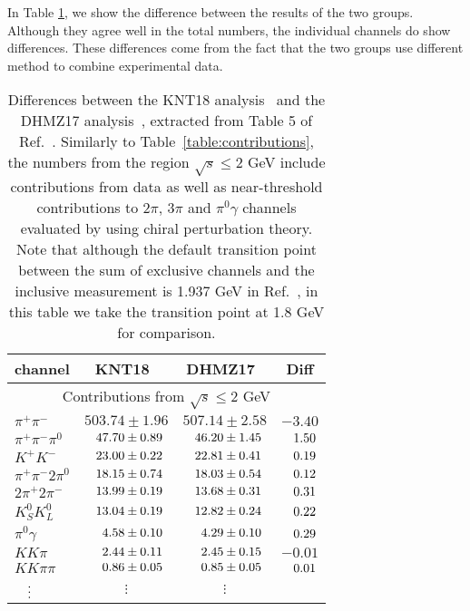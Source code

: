 In Table \ref{table:comparison}, we show the difference
between the results of the two groups.  Although they 
agree well in the total numbers, the individual channels
do show differences.  These differences come from the
fact that the two groups use different method to combine
experimental data.


\begin{table*} 
\caption{Differences between the KNT18 analysis~\cite{KNT18} 
and the DHMZ17 analysis~\cite{DHMZ17}, extracted from 
Table 5 of Ref.~\cite{KNT18}. 
Similarly to Table~\ref{table:contributions}, the numbers
from the region $\sqrt{s} \leq 2$ GeV
include contributions from data as well as near-threshold
contributions to $2\pi$, $3\pi$ and $\pi^0\gamma$ channels
evaluated by using chiral perturbation theory.
Note that although the default transition point
between the sum of exclusive channels and the inclusive
measurement is 1.937 GeV in Ref.~\cite{KNT18}, in this 
table we take the transition point at 1.8 GeV for comparison.}
%
\label{table:comparison}
%
\begin{center} \begin{tabular}{|l|c|c|c|}
\hline
channel        & KNT18~\cite{KNT18}    & DHMZ17~\cite{HLMNT} & Diff \\
\hline
\multicolumn{4}{|c|}{Contributions from $\sqrt{s} \leq 2$ GeV} \\
\hline
$\pi^+\pi^-$   &    $503.74 \pm 1.96$  &    $507.14 \pm 2.58$    & $-3.40$ \\
$\pi^+\pi^-\pi^0$
               & $\hpz47.70 \pm 0.89$  & $\hpz46.20 \pm 1.45$ & $\hph1.50$ \\
$K^+ K^-$      & $\hpz23.00 \pm 0.22$  & $\hpz22.81 \pm 0.41$ & $\hph0.19$ \\
$\pi^+ \pi^- 2\pi^0$
               & $\hpz18.15 \pm 0.74$  & $\hpz18.03 \pm 0.54$ & $\hph0.12$ \\
$2\pi^+ 2\pi^-$& $\hpz13.99 \pm 0.19$  & $\hpz13.68 \pm 0.31$ & $\hph0.31$\\
$K_S^0 K_L^0$  & $\hpz13.04 \pm 0.19$  & $\hpz12.82 \pm 0.24$ & $\hph0.22$ \\
$\pi^0 \gamma$ & $\hpzz4.58 \pm 0.10$  & $\hpzz4.29 \pm 0.10$ & $\hph0.29$ \\
$KK\pi$        & $\hpzz2.44 \pm 0.11$  & $\hpzz2.45 \pm 0.15$ & $-0.01$ \\
$KK\pi\pi$     & $\hpzz0.86 \pm 0.05$  & $\hpzz0.85 \pm 0.05$ & $\hph0.01$ \\
$\hpzz\vdots$  &  $\vdots$  &  $\vdots$   & \\

\end{tabular}
\end{center}
\end{table*}

